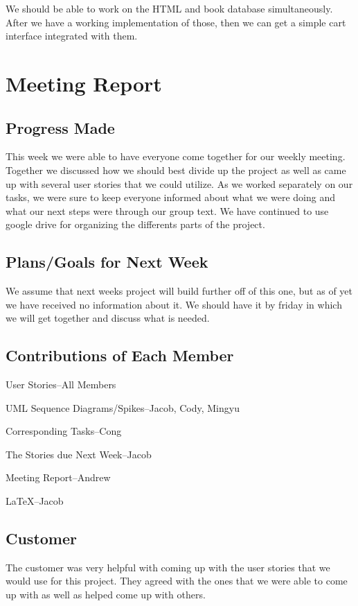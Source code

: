 \documentclass[12pt]{article}
\begin{document}
		We should be able to work on the HTML and book database simultaneously. 
		After we have a working implementation of those, then we can get a simple cart interface integrated with them.



	\section{Meeting Report}
		\subsection{Progress Made}
		This week we were able to have everyone come together for our weekly meeting. 
		Together we discussed how we should best divide up the project as well as came up with several user stories that we could utilize. 
		As we worked separately on our tasks, we were sure to keep everyone informed about what we were doing and what our next steps were through our group text. 
		We have continued to use google drive for organizing the differents parts of the project.  

		\subsection{Plans/Goals for Next Week}
		We assume that next weeks project will build further off of this one, but as of yet we have received no information about it. 
		We should have it by friday in which we will get together and discuss what is needed.

		\subsection{Contributions of Each Member}
		\quad User Stories--All Members \par
		UML Sequence Diagrams/Spikes--Jacob, Cody, Mingyu\par
		Corresponding Tasks--Cong \par
		The Stories due Next Week--Jacob \par
		Meeting Report--Andrew \par
		LaTeX--Jacob

		\subsection{Customer}
		The customer was very helpful with coming up with the user stories that we would use for this project. 
		They agreed with the ones that we were able to come up with as well as helped come up with others.

	
\end{document}
